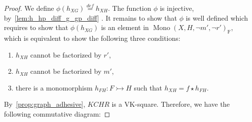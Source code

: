 \begin{proof}
       
        We define $\phi(h_{XG}) \overset{def}{=} h_{XH}$. The function $\phi$ is injective, by~\autoref{lem:h_hp_diff_g_gp_diff} . It remains to show that $\phi$ is well defined which requires to show that $\phi(h_{XG})$ is an element in $\operatorname{Mono}(X,H,\lnot m', \lnot r')_{\operatorname{F}}$, which is equivalent to show the following three conditions:
        \begin{enumerate}
            \item $h_{XH}$ cannot be factorized by $r'$,
            \item $h_{XH}$ cannot be factorized by $m'$,
            \item there is a monomorphism $h_{FH}:F \rightarrowtail H$ such that $h_{XH} = f \star h_{FH}$.
        \end{enumerate}

        By~\autoref{prop:graph_adhesive}, $KCHR$ is a VK-square. Therefore, we have the following commutative diagram:


\end{proof}
